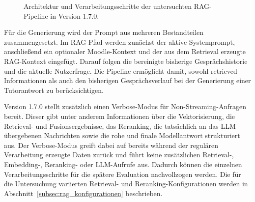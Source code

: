 \begin{figure}[htbp]
 
    \caption{Architektur und Verarbeitungsschritte der untersuchten RAG-Pipeline in Version 1.7.0.}
    \label{fig:system_pipeline}
\end{figure}
 
Für die Generierung wird der Prompt aus mehreren Bestandteilen zusammengesetzt. Im RAG-Pfad werden zunächst der aktive Systemprompt, anschließend ein optionaler Moodle-Kontext und der aus dem Retrieval erzeugte RAG-Kontext eingefügt. Darauf folgen die bereinigte bisherige Gesprächshistorie und die aktuelle Nutzerfrage. Die Pipeline ermöglicht damit, sowohl retrieved Informationen als auch den bisherigen Gesprächsverlauf bei der Generierung einer Tutorantwort zu berücksichtigen.
 
Version 1.7.0 stellt zusätzlich einen Verbose-Modus für Non-Streaming-Anfragen bereit. Dieser gibt unter anderem Informationen über die Vektorisierung, die Retrieval- und Fusionsergebnisse, das Reranking, die tatsächlich an das LLM übergebenen Nachrichten sowie die rohe und finale Modellantwort strukturiert aus. Der Verbose-Modus greift dabei auf bereits während der regulären Verarbeitung erzeugte Daten zurück und führt keine zusätzlichen Retrieval-, Embedding-, Reranking- oder LLM-Aufrufe aus. Dadurch können die einzelnen Verarbeitungsschritte für die spätere Evaluation nachvollzogen werden. Die für die Untersuchung variierten Retrieval- und Reranking-Konfigurationen werden in Abschnitt~\ref{subsec:rag_konfigurationen} beschrieben.
 
